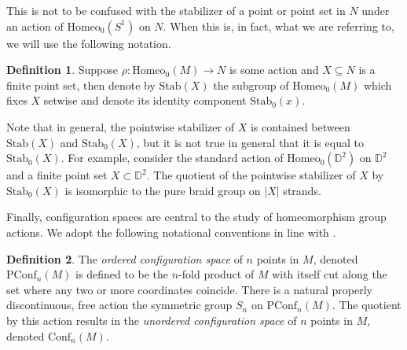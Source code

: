\documentclass[10pt, oneside]{article}
\newcommand{\D}{\mathbb{D}}
\newcommand{\homeo}[1][S^1]{\text{Homeo}_0(#1)}
\newcommand{\conf}[2][S^1]{\text{Conf}_{#2}(#1)}
\newcommand{\pconf}[2][S^1]{\text{PConf}_{#2}(#1)}
\newcommand{\stab}[1]{\text{Stab}(#1)}
\newcommand{\pstab}[1]{\text{Stab}_0(#1)}
\theoremstyle{definition}
\newtheorem{defn}{Definition}[section]
\theoremstyle{definition}
\begin{document}
This is not to be confused with the stabilizer of a point or point set in $N$ under an action of $\homeo$ on $N$. When this is, in fact, what we are referring to, we will use the following notation.

\begin{defn}
    Suppose $\rho: \homeo[M]\to N$ is some action and $X\subseteq N$ is a finite point set, then denote by $\stab{X}$ the subgroup of $\homeo[M]$ which fixes $X$ setwise and denote its identity component $\pstab{x}$. 
\end{defn} 

Note that in general, the pointwise stabilizer of $X$ is contained between $\stab{X}$ and $\pstab{X}$, but it is not true in general that it is equal to $\pstab{X}$. For example, consider the standard action of $\homeo[\D^2]$ on $\D^2$ and a finite point set $X\subset \D^2$. The quotient of the pointwise stabilizer of $X$ by $\pstab{X}$ is isomorphic to the pure braid group on $|X|$ strands.

Finally, configuration spaces are central to the study of homeomorphism group actions. We adopt the following notational conventions in line with \cite{chen:StructureTheorems}.

\begin{defn}
    The {\it ordered configuration space} of $n$ points in $M$, denoted $\pconf[M]{n}$ is defined to be the $n$-fold product of $M$ with itself cut along the set where any two or more coordinates coincide. There is a natural properly discontinuous, free action the symmetric group $S_n$ on $\pconf[M]{n}$. The quotient by this action results in the {\it unordered configuration space} of $n$ points in $M$, denoted $\conf[M]{n}$.
\end{defn}
\end{document}
